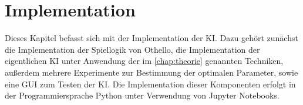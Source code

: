 
\chapter{Implementation}
\label{chap:implementation}

Dieses Kapitel befasst sich mit der Implementation der \ac{KI}. Dazu gehört zunächst die Implementation
der Spiellogik von Othello, die Implementation der eigentlichen \ac{KI} unter Anwendung der im
\autoref{chap:theorie} genannten Techniken, außerdem mehrere Experimente zur Bestimmung der optimalen Parameter, sowie eine \ac{GUI}
zum Testen der \ac{KI}. Die Implementation dieser Komponenten erfolgt in der
Programmiersprache Python unter Verwendung von Jupyter Notebooks. 






